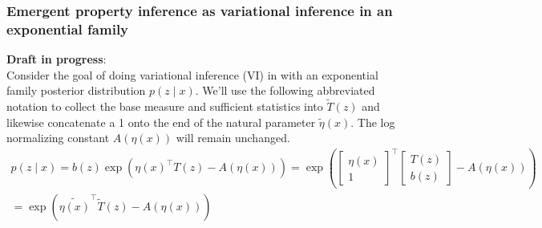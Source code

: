 \documentclass[11pt]{article}
\begin{document}
\subsubsection{Emergent property inference as variational inference in an exponential family}\label{methods_VI}
\textbf{Draft in progress}: \\
Consider the goal of doing variational inference (VI) in with an exponential family posterior distribution $p(z \mid x)$.  We'll use the following abbreviated notation to collect the base measure and sufficient statistics into $\tilde{T}(z)$ and likewise concatenate a 1 onto the end of the natural parameter $\tilde{\eta}(x)$.  The log normalizing constant $A(\eta(x))$ will remain unchanged.
\begin{equation}
\begin{split}
p(z \mid x) = b(z) \exp{\left( \eta(x)^\top T(z) - A(\eta(x)) \right)} = \exp{\left( \begin{bmatrix} \eta(x) \\ 1 \end{bmatrix}^\top \begin{bmatrix} T(z) \\ b(z) \end{bmatrix} - A(\eta(x)) \right)} \\= \exp{\left(\tilde{\eta(x)}^\top \tilde{T}(z) - A(\eta(x)) \right)} 
\end{split}
\end{equation}
\end{document}
